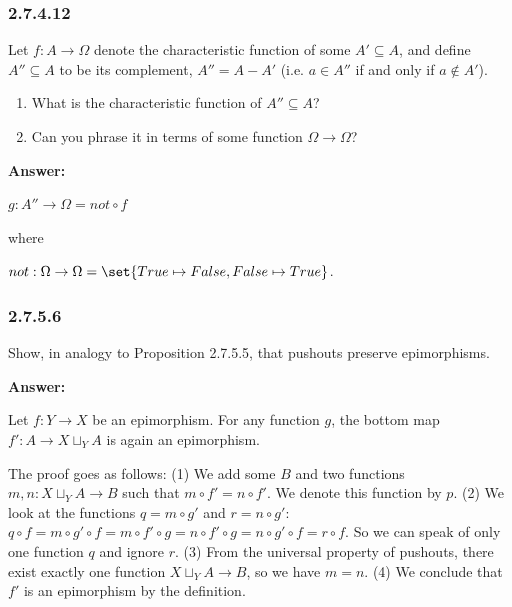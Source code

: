\documentclass{article}
\newcommand{\vsp}[0]{\vspace*{10pt}\par}
\newcommand{\exercise}[1]{\subsubsection*{#1}}
\newcommand{\ans}[0]{\vsp\textbf{Answer: }\vsp}
\newcommand{\ei}{\item}
\newcommand{\es}{\begin{enumerate}[label=(\alph*)]\ei}
\newcommand{\ee}{\end{enumerate}}
\begin{document}
\exercise{2.7.4.12}

Let $f: A \to \Omega$ denote the characteristic function of some $A' \subseteq A$, and
define $A'' \subseteq A$ to be its complement, $A'' = A - A'$ (i.e. $a \in A''$
if and only if $a \notin A'$).

\es What is the characteristic function of $A'' \subseteq A$?
\ei Can you phrase it in terms of some function $\Omega \to \Omega$?
\ee

\ans

$g: A'' \to \Omega = not \circ f$

where

$not: \Omega \to \Omega = \set{True \mapsto False, False \mapsto True}$.

\exercise{2.7.5.6}

Show, in analogy to Proposition 2.7.5.5, that pushouts preserve epimorphisms.

\ans

Let $f: Y \to X$ be an epimorphism. For any function $g$, the bottom map $f':A
\to X \sqcup_Y A$ is again an epimorphism.

\begin{center}
\end{center}

The proof goes as follows:
(1) We add some $B$ and two functions $m,n: X \sqcup_Y A \to B$ such that $m
\circ f' = n \circ f'$. We denote this function by $p$. (2) We look at the
functions $q = m \circ g'$ and $r = n \circ g'$: $q \circ f = m \circ g' \circ f
= m \circ f' \circ g = n \circ f' \circ g = n \circ g' \circ f = r \circ f$. So
we can speak of only one function $q$ and ignore $r$. (3) From the universal
property of pushouts, there exist exactly one function $X \sqcup_Y A \to B$, so
we have $m = n$. (4) We conclude that $f'$ is an epimorphism by the definition.
\end{document}
